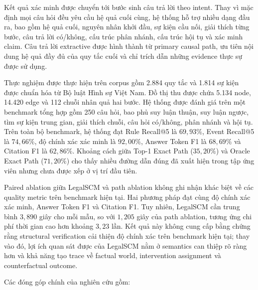 Kết quả xác minh được chuyển tới bước sinh câu trả lời theo intent. Thay vì
mặc định mọi câu hỏi đều yêu cầu hệ quả cuối cùng, hệ thống hỗ trợ nhiều dạng
đầu ra, bao gồm hệ quả cuối, nguyên nhân khởi đầu, sự kiện cầu nối, giải
thích từng bước, câu trả lời có/không, cấu trúc phân nhánh, cấu trúc hội tụ
và xác minh claim. Câu trả lời extractive được hình thành từ primary causal
path, ưu tiên nội dung hệ quả đầy đủ của quy tắc cuối và chỉ trích dẫn những
evidence thực sự được sử dụng.

Thực nghiệm được thực hiện trên corpus gồm 2.884 quy tắc và 1.814 sự kiện
được chuẩn hóa từ Bộ luật Hình sự Việt Nam. Đồ thị thu được chứa 5.134 node,
14.420 edge và 112 chuỗi nhân quả hai bước. Hệ thống được đánh giá trên một
benchmark tổng hợp gồm 250 câu hỏi, bao phủ suy luận thuận, suy luận ngược,
tìm sự kiện trung gian, giải thích chuỗi, câu hỏi có/không, phân nhánh và hội
tụ. Trên toàn bộ benchmark, hệ thống đạt Rule Recall@5 là $69{,}93\%$, Event
Recall@5 là $74{,}66\%$, độ chính xác xác minh là $92{,}00\%$, Answer Token
F1 là $68{,}69\%$ và Citation F1 là $62{,}86\%$. Khoảng cách giữa Top-1
Exact Path ($35{,}20\%$) và Oracle Exact Path ($71{,}20\%$) cho thấy nhiều
đường dẫn đúng đã xuất hiện trong tập ứng viên nhưng chưa được xếp ở vị trí
đầu tiên.

Paired ablation giữa LegalSCM và path ablation không ghi nhận khác biệt về
các quality metric trên benchmark hiện tại. Hai phương pháp đạt cùng độ
chính xác xác minh, Answer Token F1 và Citation F1. Tuy nhiên, LegalSCM cần
trung bình $3{,}890$ giây cho mỗi mẫu, so với $1{,}205$ giây của path
ablation, tương ứng chi phí thời gian cao hơn khoảng $3{,}23$ lần. Kết quả
này không cung cấp bằng chứng rằng structural verification cải thiện độ
chính xác trên benchmark hiện tại; thay vào đó, lợi ích quan sát được của
LegalSCM nằm ở semantics can thiệp rõ ràng hơn và khả năng tạo trace về
factual world, intervention assignment và counterfactual outcome.

Các đóng góp chính của nghiên cứu gồm:

